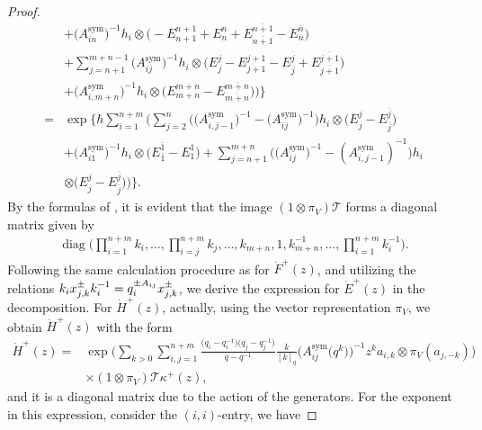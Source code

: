 \documentclass[pdftex]{sigma}
\numberwithin{equation}{section}
\begin{document}
\begin{proof}
\begin{align*}
&+
\bigl(A_{in}^{\operatorname{sym}}\bigr)^{-1}h_i\otimes\bigl(-E^{n+1}_{n+1}+E^{n}_{n}+E^{\overline{n+1}}_{\overline{n+1}}-E^{\overline{n}}_{\overline{n}}\bigr)\\
&+\sum\limits_{j=n+1}^{m+n-1}
\bigl(A_{ij}^{\operatorname{sym}}\bigr)^{-1}h_i\otimes\bigl(E^{j}_{j}-E^{j+1}_{j+1}-E^{\overline{j}}_{\overline{j}}+E^{\overline{j+1}}_{\overline{j+1}}\bigr)\\
&+\bigl(A_{i,m+n}^{\operatorname{sym}}\bigr)^{-1}h_i\otimes\bigl(E^{m+n}_{m+n}-E^{\overline{m+n}}_{\overline{m+n}}\bigr)
\Bigr)\Bigr\}\\
={}&\exp\Biggl\{\hbar\sum\limits_{i=1}^{n+m}\Biggl(\sum\limits_{j=2}^{n}\bigl(\bigl(A_{i,j-1}^{\operatorname{sym}}\bigr)^{-1}-\bigl(A_{ij}^{\operatorname{sym}}\bigr)^{-1}\bigr)h_i\otimes \bigl(E^{j}_{j}-E^{\overline{j}}_{\overline{j}}\bigr)\\
&+\bigl(A_{i1}^{\operatorname{sym}}\bigr)^{-1}h_i\otimes \bigl(E^{\overline{1}}_{\overline{1}}-E^{1}_{1}\bigr)+\sum\limits_{j=n+1}^{m+n}
\bigl(\bigl(A_{ij}^{\operatorname{sym}}\bigr)^{-1}-(A_{i,j-1}^{\operatorname{sym}})^{-1}\bigr)h_i\\
&\otimes \bigl(E^{j}_{j}-E^{\overline{j}}_{\overline{j}}\bigr)\Bigr)\Bigr\}.
\end{align*}
By the formulas of , it is evident that the image $(1\otimes\pi_V)\mathcal{T}$ forms a diagonal matrix given by
\begin{gather}\label{T12}
 \operatorname{diag}\Biggl(\prod\limits_{i=1}^{n+m}k_i, \dots, \prod\limits_{i=j}^{n+m}k_j, \dots, k_{m+n},1, k_{m+n}^{-1}, \dots, \prod\limits_{i=1}^{n+m}k_i^{-1}\Biggr).
\end{gather}
Following the same calculation procedure as for $\dot{F}^+(z)$, and utilizing the relations $\smash{k_ix_{j,k}^{\pm}k_i^{-1}}=\smash{q_i^{\pm A_{ij}}x_{j,k}^{\pm}}$, we derive the expression for $\dot{E}^+(z)$ in the decomposition.
For $\dot{H}^+(z)$, actually, using the vector representation $\pi_V$, we obtain $\dot{H}^+(z)$ with the form
\begin{align*}
 \dot{H}^+(z)={}&\exp\Biggl(\sum\limits_{k>0}\sum\limits_{i,j=1}^{n+m}\frac{\bigl(q_i-q_i^{-1}\bigr)\bigl(q_j-q_j^{-1}\bigr)}{q-q^{-1}}
 \frac{k}{[k]_q}\bigl(A_{ij}^{\operatorname{sym}}\bigl(q^k\bigr)\bigr)^{-1} z^k
 a_{i,k}\otimes\pi_V(a_{j,-k})\Biggr)\\
 &\times(1\otimes\pi_V)\mathcal{T}\kappa^{+}(z),
\end{align*}
and it is a diagonal matrix due to the action of the generators. For the exponent in this expression, consider the $(i,i)$-entry, we have

\end{proof}
\end{document}
